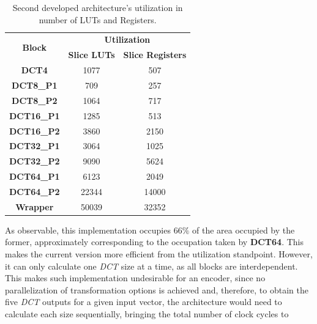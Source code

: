 \begin{table}[!htpb]
    \centering
    \caption{Second developed architecture’s utilization in number of LUTs and Registers.}
    \begin{tabular}{ccc} \toprule
        \multirow{2}{*}{\textbf{Block}}     & \multicolumn{2}{c}{\textbf{Utilization}}              \\
                                            & \textbf{Slice LUTs}      & \textbf{Slice Registers}   \\ \toprule
        \textbf{DCT4}                       & 1077                     & 507    \\
        \textbf{DCT8\_P1}                   & 709                      & 257    \\
        \textbf{DCT8\_P2}                   & 1064                     & 717    \\
        \textbf{DCT16\_P1}                  & 1285                     & 513    \\
        \textbf{DCT16\_P2}                  & 3860                     & 2150   \\
        \textbf{DCT32\_P1}                  & 3064                     & 1025   \\
        \textbf{DCT32\_P2}                  & 9090                     & 5624   \\
        \textbf{DCT64\_P1}                  & 6123                     & 2049   \\
        \textbf{DCT64\_P2}                  & 22344                    & 14000  \\ \bottomrule
        \textbf{Wrapper}                    & 50039                    & 32352  \\
        \bottomrule
    \end{tabular}    
    \label{tab:v2results}
\end{table}

As observable, this implementation occupies $66\%$ of the area occupied by the former, approximately corresponding to the occupation taken by \textbf{DCT64}. This makes the current version more efficient from the utilization standpoint. However, it can only calculate one \emph{DCT} size at a time, as all blocks are interdependent. This makes such implementation undesirable for an encoder, since no parallelization of transformation options is achieved and, therefore, to obtain the five \emph{DCT} outputs for a given input vector, the architecture would need to calculate each size sequentially, bringing the total number of clock cycles to

